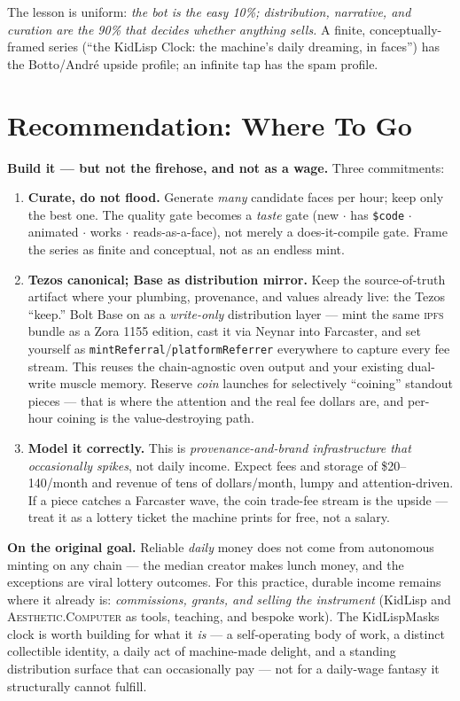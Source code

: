 \documentclass[10pt,letterpaper,twocolumn]{article}
\newcommand{\ac}{\textsc{Aesthetic.Computer}}
\begin{document}
The lesson is uniform: \emph{the bot is the easy 10\%; distribution, narrative, and curation are the 90\% that decides whether anything sells.} A finite, conceptually-framed series (``the KidLisp Clock: the machine's daily dreaming, in faces'') has the Botto/Andr\'e upside profile; an infinite tap has the spam profile.

\section{Recommendation: Where To Go}

\textbf{Build it --- but not the firehose, and not as a wage.} Three commitments:

\begin{enumerate}
  \item \textbf{Curate, do not flood.} Generate \emph{many} candidate faces per hour; keep only the best one. The quality gate becomes a \emph{taste} gate (new $\cdot$ has \texttt{\$code} $\cdot$ animated $\cdot$ works $\cdot$ reads-as-a-face), not merely a does-it-compile gate. Frame the series as finite and conceptual, not as an endless mint.
  \item \textbf{Tezos canonical; Base as distribution mirror.} Keep the source-of-truth artifact where your plumbing, provenance, and values already live: the Tezos ``keep.'' Bolt Base on as a \emph{write-only} distribution layer --- mint the same \textsc{ipfs} bundle as a Zora 1155 edition, cast it via Neynar into Farcaster, and set yourself as \texttt{mintReferral}/\texttt{platformReferrer} everywhere to capture every fee stream. This reuses the chain-agnostic oven output and your existing dual-write muscle memory. Reserve \emph{coin} launches for selectively ``coining'' standout pieces --- that is where the attention and the real fee dollars are, and per-hour coining is the value-destroying path.
  \item \textbf{Model it correctly.} This is \emph{provenance-and-brand infrastructure that occasionally spikes}, not daily income. Expect fees and storage of \$20--140/month and revenue of tens of dollars/month, lumpy and attention-driven. If a piece catches a Farcaster wave, the coin trade-fee stream is the upside --- treat it as a lottery ticket the machine prints for free, not a salary.
\end{enumerate}

\textbf{On the original goal.} Reliable \emph{daily} money does not come from autonomous minting on any chain --- the median creator makes lunch money, and the exceptions are viral lottery outcomes. For this practice, durable income remains where it already is: \emph{commissions, grants, and selling the instrument} (KidLisp and \ac{} as tools, teaching, and bespoke work). The KidLispMasks clock is worth building for what it \emph{is} --- a self-operating body of work, a distinct collectible identity, a daily act of machine-made delight, and a standing distribution surface that can occasionally pay --- not for a daily-wage fantasy it structurally cannot fulfill.
\end{document}
